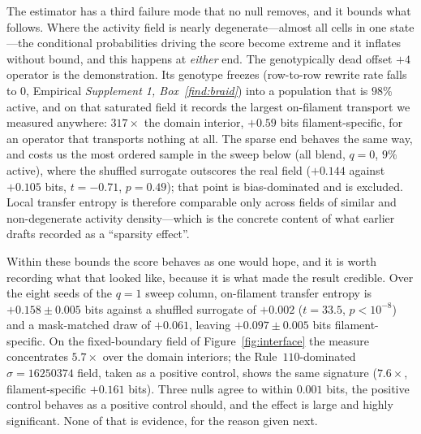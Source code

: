 \documentclass[man,12pt,floatsintext,donotrepeattitle]{apa7}
\begin{document}
The estimator has a third failure mode that no null removes, and it bounds
what follows. Where the activity field is nearly degenerate---almost all cells
in one state---the conditional probabilities driving the score become extreme
and it inflates without bound, and this happens at \emph{either} end. The
genotypically dead offset $+4$ operator is the demonstration. Its genotype
freezes (row-to-row rewrite rate falls to $0$, Empirical
\emph{Supplement 1, Box~\ref{find:braid}}) into a
population that is $98\%$ active, and on that saturated field it records the
largest on-filament transport we measured anywhere: $317\times$ the domain
interior, $+0.59$ bits filament-specific, for an operator that transports
nothing at all. The sparse end behaves the same way, and costs us the most
ordered sample in the sweep below (all blend, $q=0$, $9\%$ active), where the
shuffled surrogate outscores the real field ($+0.144$ against $+0.105$ bits,
$t = -0.71$, $p = 0.49$); that point is bias-dominated and is excluded. Local
transfer entropy is therefore comparable only across fields of similar and
non-degenerate activity density---which is the concrete content of what earlier
drafts recorded as a ``sparsity effect''.

Within these bounds the score behaves as one would hope, and it is worth
recording what that looked like, because it is what made the result credible.
Over the eight seeds of the $q=1$ sweep column, on-filament transfer entropy is
$+0.158 \pm 0.005$ bits against a shuffled surrogate of $+0.002$
($t = 33.5$, $p < 10^{-8}$) and a mask-matched draw of $+0.061$, leaving
$+0.097 \pm 0.005$ bits filament-specific. On the fixed-boundary field of
Figure~\ref{fig:interface} the measure concentrates $5.7\times$ over the domain
interiors; the Rule~$110$-dominated $\sigma = 16250374$ field, taken as a
positive control, shows the same signature ($7.6\times$, filament-specific
$+0.161$ bits). Three nulls agree to within $0.001$ bits, the positive control
behaves as a positive control should, and the effect is large and highly
significant. None of that is evidence, for the reason given next.
\end{document}
